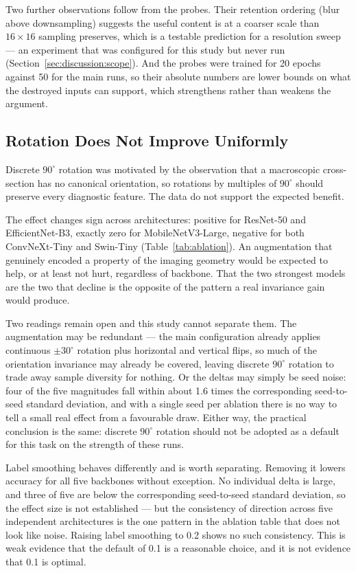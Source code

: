 Two further observations follow from the probes. Their retention ordering
(blur above downsampling) suggests the useful content is at a coarser scale
than $16\times16$ sampling preserves, which is a testable prediction for a
resolution sweep --- an experiment that was configured for this study but
never run (Section~\ref{sec:discussion:scope}). And the probes were trained
for 20 epochs against 50 for the main runs, so their absolute numbers are
lower bounds on what the destroyed inputs can support, which strengthens
rather than weakens the argument.

\subsection{Rotation Does Not Improve Uniformly}
\label{sec:discussion:rotation}

Discrete $90^\circ$ rotation was motivated by the observation that a
macroscopic cross-section has no canonical orientation, so rotations by
multiples of $90^\circ$ should preserve every diagnostic feature. The data
do not support the expected benefit.

The effect changes sign across architectures: positive for ResNet-50 and
EfficientNet-B3, exactly zero for MobileNetV3-Large, negative for both
ConvNeXt-Tiny and Swin-Tiny (Table~\ref{tab:ablation}). An augmentation that
genuinely encoded a property of the imaging geometry would be expected to
help, or at least not hurt, regardless of backbone. That the two strongest
models are the two that decline is the opposite of the pattern a real
invariance gain would produce.

Two readings remain open and this study cannot separate them. The
augmentation may be redundant --- the main configuration already applies
continuous $\pm30^\circ$ rotation plus horizontal and vertical flips, so
much of the orientation invariance may already be covered, leaving discrete
$90^\circ$ rotation to trade away sample diversity for nothing. Or the
deltas may simply be seed noise: four of the five magnitudes fall within
about 1.6 times the corresponding seed-to-seed standard deviation, and with
a single seed per ablation there is no way to tell a small real effect from
a favourable draw. Either way, the practical conclusion is the same:
discrete $90^\circ$ rotation should not be adopted as a default for this
task on the strength of these runs.

Label smoothing behaves differently and is worth separating. Removing it
lowers accuracy for all five backbones without exception. No individual
delta is large, and three of five are below the corresponding seed-to-seed
standard deviation, so the effect size is not established --- but the
consistency of direction across five independent architectures is the one
pattern in the ablation table that does not look like noise. Raising label
smoothing to 0.2 shows no such consistency. This is weak evidence that the
default of 0.1 is a reasonable choice, and it is not evidence that 0.1 is
optimal.

